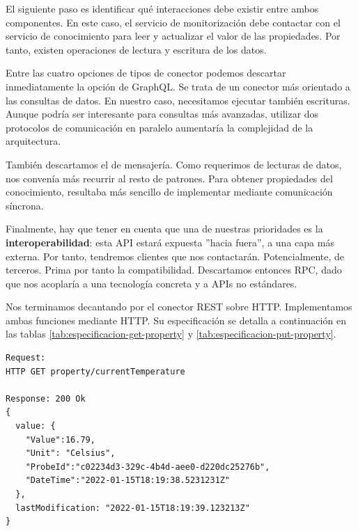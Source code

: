 El siguiente paso es identificar qué interacciones debe existir entre ambos componentes. En este caso, el servicio de monitorización debe contactar con el servicio de conocimiento para leer y actualizar el valor de las propiedades. Por tanto, existen operaciones de lectura y escritura de los datos.

Entre las cuatro opciones de tipos de conector podemos descartar inmediatamente la opción de GraphQL. Se trata de un conector más orientado a las consultas de datos. En nuestro caso, necesitamos ejecutar también escrituras. Aunque podría ser interesante para consultas más avanzadas, utilizar dos protocolos de comunicación en paralelo aumentaría la complejidad de la arquitectura.

También descartamos el  de mensajería. Como requerimos de lecturas de datos, nos convenía más recurrir al resto de patrones. Para obtener propiedades del conocimiento, resultaba más sencillo de implementar mediante comunicación síncrona.

Finalmente, hay que tener en cuenta que una de nuestras prioridades es la \textbf{interoperabilidad}: esta API estará expuesta ''hacia fuera'', a una capa más externa. Por tanto, tendremos clientes que nos contactarán. Potencialmente, de terceros. Prima por tanto la compatibilidad. Descartamos entonces RPC, dado que nos acoplaría a una tecnología concreta y a APIs no estándares.

Nos terminamos decantando por el conector REST sobre HTTP. Implementamos ambas funciones mediante  HTTP. Su especificación se detalla a continuación en las tablas \ref{tab:especificacion-get-property} y \ref{tab:especificacion-put-property}.

\newsavebox\getpropertyrequestbox
\begin{lrbox}{\getpropertyrequestbox}
  \begin{minipage}[t]{1in}
    \begin{verbatim}
Request:
HTTP GET property/currentTemperature

Response: 200 Ok
{
  value: {
    "Value":16.79,
    "Unit": "Celsius",
    "ProbeId":"c02234d3-329c-4b4d-aee0-d220dc25276b",
    "DateTime":"2022-01-15T18:19:38.5231231Z"
  },
  lastModification: "2022-01-15T18:19:39.123213Z"
}
    \end{verbatim}
  \end{minipage}
\end{lrbox}

